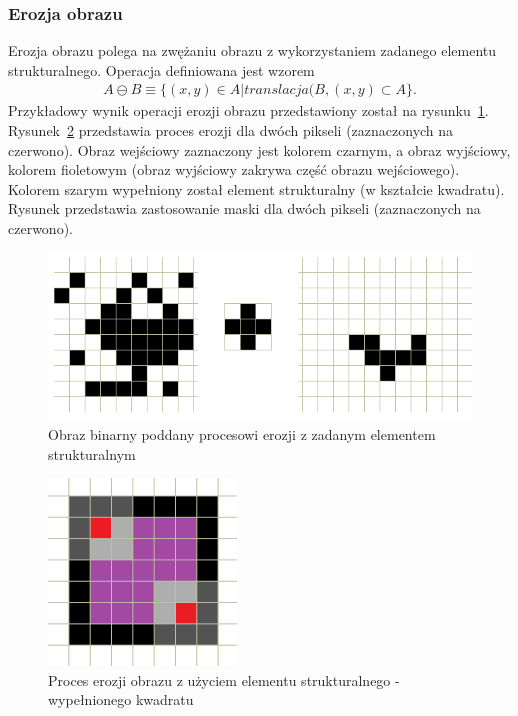 \subsubsection{Erozja obrazu} 
Erozja obrazu polega na zwężaniu obrazu z wykorzystaniem zadanego elementu strukturalnego. Operacja definiowana jest wzorem
\begin{gather*}
  A \ominus B \equiv \{ (x, y) \in A | translacja(B, (x, y) \subset A \}.
\end{gather*}
Przykładowy wynik operacji erozji obrazu przedstawiony został na rysunku~\ref{fig:erode}. Rysunek~\ref{fig:erode_better_example} przedstawia proces erozji dla dwóch pikseli (zaznaczonych na czerwono). Obraz wejściowy zaznaczony jest kolorem czarnym, a obraz wyjściowy, kolorem fioletowym (obraz wyjściowy zakrywa część obrazu wejściowego). Kolorem szarym wypełniony został element strukturalny (w kształcie kwadratu). Rysunek przedstawia zastosowanie maski dla dwóch pikseli (zaznaczonych na czerwono).
\begin{figure}
  \centering
  \includegraphics[width=15cm]{img/erode}
  \caption{Obraz binarny poddany procesowi erozji z zadanym elementem strukturalnym}
  \label{fig:erode}
\end{figure}
\begin{figure}
  \centering
  \includegraphics[width=5cm]{img/erode-better-example}
  \caption{Proces erozji obrazu z użyciem elementu strukturalnego - wypełnionego kwadratu}
  \label{fig:erode_better_example}
\end{figure}
